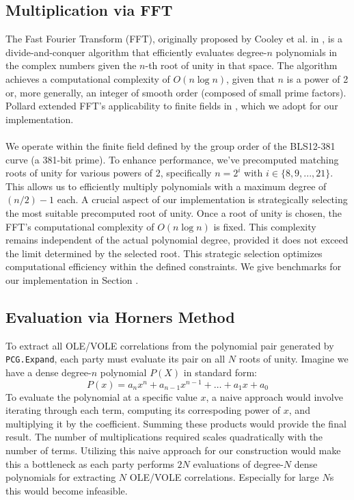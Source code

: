 \subsection{Multiplication via FFT}
The Fast Fourier Transform (FFT), originally proposed by Cooley et al. in \cite{cooley1965algorithm}, is a divide-and-conquer algorithm that efficiently evaluates degree-$n$ polynomials in the complex numbers given the $n$-th root of unity in that space. The algorithm achieves a computational complexity of $O(n\log n)$, given that $n$ is a power of 2 or, more generally, an integer of smooth order (composed of small prime factors). Pollard extended FFT's applicability to finite fields in \cite{pollard1971fast}, which we adopt for our implementation. 
\\\\
We operate within the finite field defined by the group order of the BLS12-381 curve (a 381-bit prime). To enhance performance, we've precomputed matching roots of unity for various powers of 2, specifically $n=2^i$ with $i \in \{8, 9, ..., 21\}$. This allows us to efficiently multiply polynomials with a maximum degree of $(n/2)-1$ each. A crucial aspect of our implementation is strategically selecting the most suitable precomputed root of unity. Once a root of unity is chosen, the FFT's computational complexity of $O(n \log n)$ is fixed. This complexity remains independent of the actual polynomial degree, provided it does not exceed the limit determined by the selected root. This strategic selection optimizes computational efficiency within the defined constraints. We give benchmarks for our implementation in Section \todo.

\subsection{Evaluation via Horners Method}
\label{subsec:horner}
To extract all OLE/VOLE correlations from the polynomial pair generated by \texttt{PCG.Expand}, each party must evaluate its pair on all $N$ roots of unity. Imagine we have a dense degree-$n$ polynomial $P(X)$ in standard form:
$$
P(x) = a_n x^n + a_{n-1} x^{n-1} + \dots + a_1 x + a_0
$$
To evaluate the polynomial at a specific value $x$, a naive approach would involve iterating through each term, computing its correspoding power of $x$, and multiplying it by the coefficient. Summing these products would provide the final result. The number of multiplications required scales quadratically with the number of terms. Utilizing this naive approach for our construction would make this a bottleneck as each party performs $2N$ evaluations of degree-$N$ dense polynomials for extracting $N$ OLE/VOLE correlations. Especially for large $N$s this would become infeasible.

